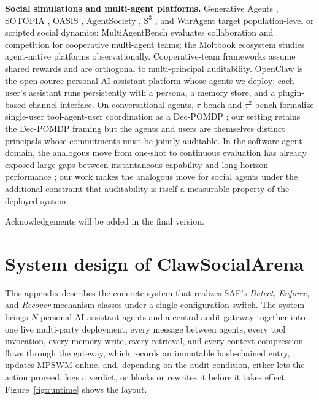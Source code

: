 \documentclass{article}
\begin{document}
\textbf{Social simulations and multi-agent platforms.} Generative Agents \citep{park2023generative}, SOTOPIA \citep{zhou2024sotopia}, OASIS \citep{oasis2024}, AgentSociety \citep{piao2025agentsociety}, $\mathrm{S}^3$ \citep{gao2023s3}, and WarAgent \citep{hua2024warandpeace} target population-level or scripted social dynamics; MultiAgentBench \citep{zhu2025multiagentbench} evaluates collaboration and competition for cooperative multi-agent teams; the Moltbook ecosystem \citep{jiang2026moltbook,moltbook2026socialization,moltnet2026,collective2026moltbook} studies agent-native platforms observationally. Cooperative-team frameworks \citep{hong2024metagpt,wu2023autogen,chen2024agentverse,li2023camel,qian2025scaling} assume shared rewards and are orthogonal to multi-principal auditability. OpenClaw \citep{openclaw2025} is the open-source personal-AI-assistant platform whose agents we deploy: each user's assistant runs persistently with a persona, a memory store, and a plugin-based channel interface. On conversational agents, $\tau$-bench \citep{yao2024taubench} and $\tau^2$-bench \citep{barres2025tau2bench} formalize single-user tool-agent-user coordination as a Dec-POMDP \citep{oliehoek2016decpomdp}; our setting retains the Dec-POMDP framing but the agents and users are themselves distinct principals whose commitments must be jointly auditable. In the software-agent domain, the analogous move from one-shot to continuous evaluation has already exposed large gaps between instantaneous capability and long-horizon performance \citep{deng2026evoclaw}; our work makes the analogous move for social agents under the additional constraint that auditability is itself a measurable property of the deployed system.

\begin{ack}
Acknowledgements will be added in the final version.
\end{ack}





\appendix

\section{System design of ClawSocialArena}
\label{sec:appendix:system}

This appendix describes the concrete system that realizes SAF's \emph{Detect}, \emph{Enforce}, and \emph{Recover} mechanism classes under a single configuration switch. The system brings $N$ personal-AI-assistant agents and a central audit gateway together into one live multi-party deployment; every message between agents, every tool invocation, every memory write, every retrieval, and every context compression flows through the gateway, which records an immutable hash-chained entry, updates MPSWM online, and, depending on the audit condition, either lets the action proceed, logs a verdict, or blocks or rewrites it before it takes effect. Figure~\ref{fig:runtime} shows the layout.
\end{document}
